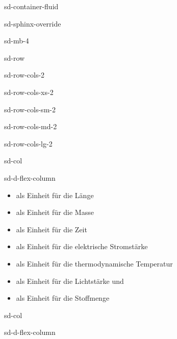 \documentclass[letterpaper,10pt,english]{jupyterBook}
\begin{document}
\begin{sphinxuseclass}{sd-container-fluid}
\begin{sphinxuseclass}{sd-sphinx-override}
\begin{sphinxuseclass}{sd-mb-4}
\begin{sphinxuseclass}{sd-row}
\begin{sphinxuseclass}{sd-row-cols-2}
\begin{sphinxuseclass}{sd-row-cols-xs-2}
\begin{sphinxuseclass}{sd-row-cols-sm-2}
\begin{sphinxuseclass}{sd-row-cols-md-2}
\begin{sphinxuseclass}{sd-row-cols-lg-2}
\begin{sphinxuseclass}{sd-col}
\begin{sphinxuseclass}{sd-d-flex-column}\begin{itemize}
\item {} 
\sphinxAtStartPar
{} als Einheit für die Länge

\item {} 
\sphinxAtStartPar
{} als Einheit für die Masse

\item {} 
\sphinxAtStartPar
{} als Einheit für die Zeit

\item {} 
\sphinxAtStartPar
{} als Einheit für die elektrische Stromstärke

\item {} 
\sphinxAtStartPar
{} als Einheit für die thermodynamische Temperatur

\item {} 
\sphinxAtStartPar
{} als Einheit für die Lichtstärke und

\item {} 
\sphinxAtStartPar
{} als Einheit für die Stoffmenge

\end{itemize}

\end{sphinxuseclass}
\end{sphinxuseclass}
\begin{sphinxuseclass}{sd-col}
\begin{sphinxuseclass}{sd-d-flex-column}
\sphinxAtStartPar
{}

\end{sphinxuseclass}
\end{sphinxuseclass}
\end{sphinxuseclass}
\end{sphinxuseclass}
\end{sphinxuseclass}
\end{sphinxuseclass}
\end{sphinxuseclass}
\end{sphinxuseclass}
\end{sphinxuseclass}
\end{sphinxuseclass}
\end{sphinxuseclass}
\end{document}
